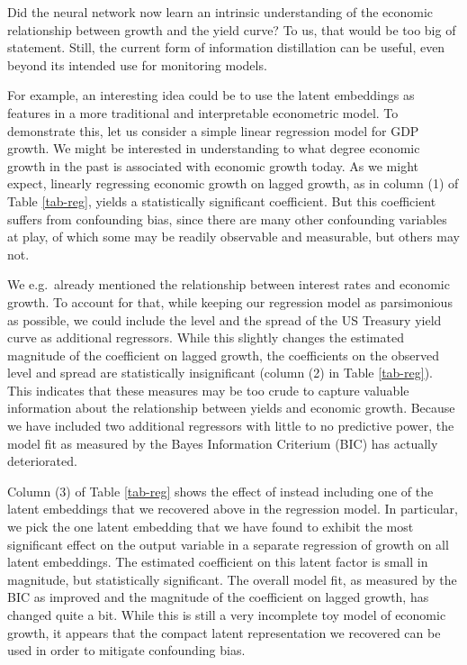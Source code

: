 \documentclass{article}
\theoremstyle{plain}
\theoremstyle{definition}
\theoremstyle{remark}
\begin{document}
Did the neural network now learn an intrinsic understanding of the economic relationship between growth and the yield curve? To us, that would be too big of statement. Still, the current form of information distillation can be useful, even beyond its intended use for monitoring models.

For example, an interesting idea could be to use the latent embeddings as features in a more traditional and interpretable econometric model. To demonstrate this, let us consider a simple linear regression model for GDP growth. We might be interested in understanding to what degree economic growth in the past is associated with economic growth today. As we might expect, linearly regressing economic growth on lagged growth, as in column (1) of Table \ref{tab-reg}, yields a statistically significant coefficient. But this coefficient suffers from confounding bias, since there are many other confounding variables at play, of which some may be readily observable and measurable, but others may not.

We e.g.\ already mentioned the relationship between interest rates and economic growth. To account for that, while keeping our regression model as parsimonious as possible, we could include the level and the spread of the US Treasury yield curve as additional regressors. While this slightly changes the estimated magnitude of the coefficient on lagged growth, the coefficients on the observed level and spread are statistically insignificant (column (2) in Table \ref{tab-reg}). This indicates that these measures may be too crude to capture valuable information about the relationship between yields and economic growth. Because we have included two additional regressors with little to no predictive power, the model fit as measured by the Bayes Information Criterium (BIC) has actually deteriorated.

Column (3) of Table \ref{tab-reg} shows the effect of instead including one of the latent embeddings that we recovered above in the regression model. In particular, we pick the one latent embedding that we have found to exhibit the most significant effect on the output variable in a separate regression of growth on all latent embeddings. The estimated coefficient on this latent factor is small in magnitude, but statistically significant. The overall model fit, as measured by the BIC as improved and the magnitude of the coefficient on lagged growth, has changed quite a bit. While this is still a very incomplete toy model of economic growth, it appears that the compact latent representation we recovered can  be used in order to mitigate confounding bias.
\end{document}
